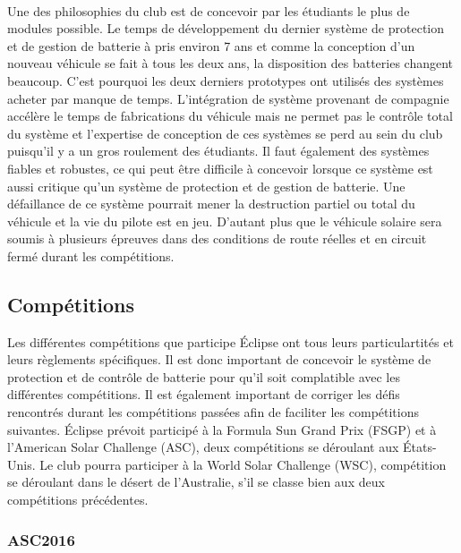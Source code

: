 		\paragraph{}
		Une des philosophies du club est de concevoir par les étudiants le plus de modules possible. Le temps de développement du dernier système de protection et de gestion de batterie à pris environ 7 ans et comme la conception d'un nouveau véhicule se fait à tous les deux ans, la disposition des batteries changent beaucoup. C'est pourquoi les deux derniers prototypes ont utilisés des systèmes acheter par manque de temps. L'intégration de système provenant de compagnie accélère le temps de fabrications du véhicule mais ne permet pas le contrôle total du système et l'expertise de conception de ces systèmes se perd au sein du club puisqu'il y a un gros roulement des étudiants. Il faut également des systèmes fiables et robustes, ce qui peut être difficile à concevoir lorsque ce système est aussi critique qu'un système de protection et de gestion de batterie. Une défaillance de ce système pourrait mener la destruction partiel ou total du véhicule et la vie du pilote est en jeu. D'autant plus que le véhicule solaire sera soumis à plusieurs épreuves dans des conditions de route réelles et en circuit fermé durant les compétitions.
		
	
	\subsection{Compétitions}
	Les différentes compétitions que participe Éclipse ont tous leurs particulartités et leurs règlements spécifiques. Il est donc important de concevoir le système de protection et de contrôle de batterie pour qu'il soit complatible avec les différentes compétitions. Il est également important de corriger les défis rencontrés durant les compétitions passées afin de faciliter les compétitions suivantes. Éclipse prévoit participé à la Formula Sun Grand Prix (FSGP) et à l'American Solar Challenge (ASC), deux compétitions se déroulant aux États-Unis. Le club pourra participer à la World Solar Challenge (WSC), compétition se déroulant dans le désert de l'Australie, s'il se classe bien aux deux compétitions précédentes.
	
	\subsubsection{ASC2016}
		
